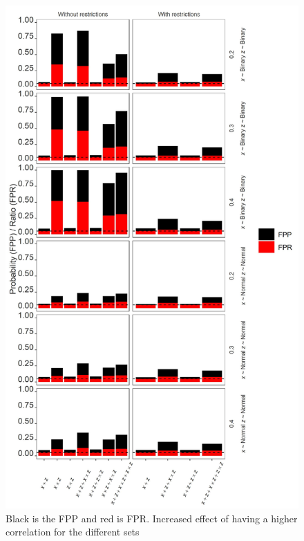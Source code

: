 \begin{figure}[ht]
\includegraphics{R/Analysis/Result/Figures/Figure2SI.jpeg}
\centering
\caption{Black is the FPP and red is FPR.  Increased effect of having a higher correlation for the different sets}
\label{fig:mainfigure}
\end{figure}

